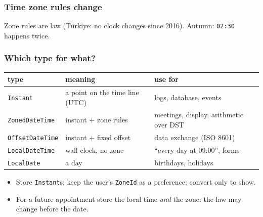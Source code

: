 \documentclass[aspectratio=169,10pt,compress]{beamer}
\begin{document}




\begin{frame}[t,fragile] \frametitle{Time zone rules change}

  \vspace{0.1em}
  \small
  Zone rules are law (Türkiye: no clock changes since 2016). Autumn: \texttt{02:30} happens twice.
\end{frame}




\begin{frame}[t,fragile] \frametitle{Which type for what?}
  \begin{center}\small
  \begin{tabular}{L{0.22\textwidth}L{0.38\textwidth}L{0.3\textwidth}}
    \toprule
    \textbf{type} & \textbf{meaning} & \textbf{use for} \\
    \midrule
    \texttt{Instant}        & a point on the time line (UTC)        & logs, database, events \\
    \texttt{ZonedDateTime}  & instant + zone rules                  & meetings, display, arithmetic over DST \\
    \texttt{OffsetDateTime} & instant + fixed offset                & data exchange (ISO 8601) \\
    \texttt{LocalDateTime}  & wall clock, no zone                   & ``every day at 09:00'', forms \\
    \texttt{LocalDate}      & a day                                 & birthdays, holidays \\
    \bottomrule
  \end{tabular}
  \end{center}
  \begin{itemize}\small
    \item Store \texttt{Instant}s; keep the user's \texttt{ZoneId} as a preference; convert only to show.
    \item For a future appointment store the local time \emph{and} the zone: the law may change before the date.
  \end{itemize}
\end{frame}
\end{document}
